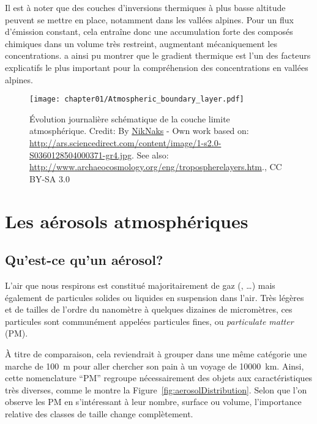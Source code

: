 Il est à noter que des couches d'inversions thermiques à plus basse altitude peuvent se
mettre en place, notamment dans les vallées alpines. Pour un flux d'émission
constant, cela entraîne donc une accumulation forte des composés chimiques dans un volume
très restreint, augmentant mécaniquement les concentrations.
\cite{allardQualite2018} a ainsi pu montrer que le gradient thermique est l'un des
facteurs explicatifs le plus important pour la compréhension des concentrations en
vallées alpines.

\begin{figure}[h]
    \centering
    \texttt{[image: chapter01/Atmospheric\_boundary\_layer.pdf]}
    \caption{Évolution journalière schématique de la couche limite atmosphérique.
        Credit: By
        \href{https://commons.wikimedia.org/w/index.php?curid=18862904}{NikNaks} - Own
        work based on:
        \url{http://ars.sciencedirect.com/content/image/1-s2.0-S0360128504000371-gr4.jpg}.
        See also: \url{http://www.archaeocosmology.org/eng/tropospherelayers.htm}., CC
        BY-SA 3.0
    }%
    \label{fig:chapter01/Atmospheric_boundary_layer}
\end{figure}


\section{Les aérosols atmosphériques}%
\label{sec:les_aerosols_atmospheriques}

\subsection{Qu'est-ce qu'un aérosol?}%
\label{sub:quest-ce-quun-aerosol}

L'air que nous respirons est constitué majoritairement de gaz (, …) mais
également de particules solides ou liquides en suspension dans l'air. Très
légères et de tailles de l'ordre du nanomètre à quelques dizaines de micromètres,
ces particules sont communément appelées particules fines, ou \textit{particulate matter} (PM).

À titre de comparaison, cela reviendrait à grouper dans une même catégorie une marche de
\SI{100}{m} pour aller chercher son pain à un voyage de \SI{10000}{km}.
Ainsi, cette nomenclature ``PM'' regroupe nécessairement des objets aux caractéristiques
très diverses, comme le montre la Figure~\ref{fig:aerosolDistribution}. Selon
que l'on observe les PM en s'intéressant à leur nombre, surface ou volume, l'importance
relative des classes de taille change complètement.

